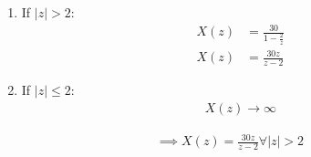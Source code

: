\documentclass[journal,12pt,twocolumn]{IEEEtran}
\theoremstyle{remark}
\begin{document}
\begin{enumerate}
\begin{enumerate}
\item If $|z| > 2$:
\begin{align}
X(z) &= \frac{30}{1 - \frac{2}{z}} \\
X(z) &= \frac{30z}{z - 2}
\end{align}

\item If $|z| \le 2$:
\begin{align}
X(z) \to \infty
\end{align}

\end{enumerate}

\begin{align}
\implies X(z) = \frac{30z}{z - 2} \forall |z| > 2
\end{align}

\end{enumerate}
\end{document}
